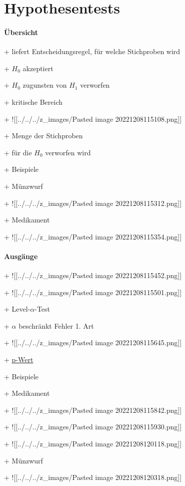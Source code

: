 \documentclass[10pt]{report}
\begin{document}
\chapter{Hypothesentests}\label{ch:Hypothesentests}

\subsubsection{Übersicht}

+ liefert Entscheidungsregel, für welche Stichproben wird

+ $H_0$ akzeptiert

+ $H_0$ zugunsten von $H_1$ verworfen

+ kritische Bereich

+ ![[../../../z\_images/Pasted image 20221208115108.png]]

+ Menge der Stichproben

+ für die $H_0$ verworfen wird

+ Beispiele

+ Münzwurf

+ ![[../../../z\_images/Pasted image 20221208115312.png]]

+ Medikament

+ ![[../../../z\_images/Pasted image 20221208115354.png]]


\subsubsection{Ausgänge}

+ ![[../../../z\_images/Pasted image 20221208115452.png]]

+ ![[../../../z\_images/Pasted image 20221208115501.png]]

+ Level-$\alpha$-Test

+ $\alpha$ beschränkt Fehler 1. Art

+ ![[../../../z\_images/Pasted image 20221208115645.png]]

+ \hyperref[ch:P-Wert]{p-Wert}

+ Beispiele

+ Medikament

+ ![[../../../z\_images/Pasted image 20221208115842.png]]

+ ![[../../../z\_images/Pasted image 20221208115930.png]]

+ ![[../../../z\_images/Pasted image 20221208120118.png]]

+ Münzwurf

+ ![[../../../z\_images/Pasted image 20221208120318.png]]
\end{document}
